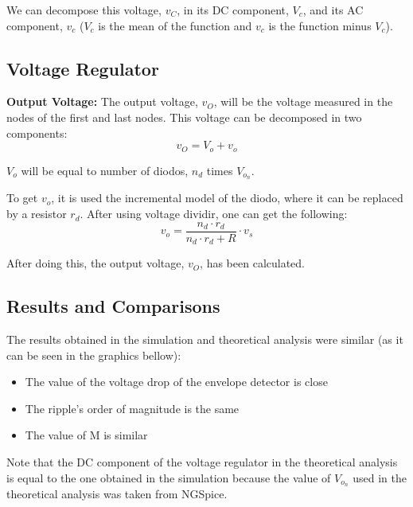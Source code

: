 We can decompose this voltage, $v_C$, in its DC component, $V_c$, and its AC component, $v_c$ ($V_c$ is the mean of the function and $v_c$ is the function minus $V_c$).


\subsection{Voltage Regulator}

\textbf{Output Voltage:}
The output voltage, $v_O$, will be the voltage measured in the nodes of the first and last nodes.
This voltage can be decomposed in two components: $$v_O = V_o + v_o$$

$V_o $ will be equal to number of diodos, $n_d$ times $V_o_n$.

To get $v_o$, it is used the incremental model of the diodo, where it can be replaced by a resistor $r_d$.
After using voltage dividir, one can get the following:
$$ v_o = \frac{n_d \cdot r_d}{n_d \cdot r_d + R} \cdot v_s$$

After doing this, the output voltage, $v_O$, has been calculated.





\subsection{Results and Comparisons}



The results obtained in the simulation and theoretical analysis were similar (as it can be seen in the graphics bellow):

\begin{itemize}
  \item The value of the voltage drop of the envelope detector is close
  \item The ripple's order of magnitude is the same
  \item The value of M is similar
\end{itemize}

Note that the DC component of the voltage regulator in the theoretical analysis is equal to the one obtained in the simulation because the value of $V_o_n$ used in the theoretical analysis was taken from NGSpice. 


